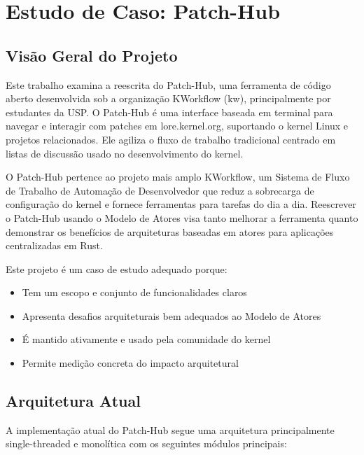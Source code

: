 \chapter{Estudo de Caso: Patch-Hub}

\section{Visão Geral do Projeto}

Este trabalho examina a reescrita do Patch-Hub, uma ferramenta de código aberto desenvolvida sob a organização KWorkflow (kw), principalmente por estudantes da USP. O Patch-Hub é uma interface baseada em terminal para navegar e interagir com patches em lore.kernel.org, suportando o kernel Linux e projetos relacionados. Ele agiliza o fluxo de trabalho tradicional centrado em listas de discussão usado no desenvolvimento do kernel.

O Patch-Hub pertence ao projeto mais amplo KWorkflow, um Sistema de Fluxo de Trabalho de Automação de Desenvolvedor que reduz a sobrecarga de configuração do kernel e fornece ferramentas para tarefas do dia a dia. Reescrever o Patch-Hub usando o Modelo de Atores visa tanto melhorar a ferramenta quanto demonstrar os benefícios de arquiteturas baseadas em atores para aplicações centralizadas em Rust.

Este projeto é um caso de estudo adequado porque:

\begin{itemize}
    \item Tem um escopo e conjunto de funcionalidades claros
    \item Apresenta desafios arquiteturais bem adequados ao Modelo de Atores
    \item É mantido ativamente e usado pela comunidade do kernel
    \item Permite medição concreta do impacto arquitetural
\end{itemize}

\section{Arquitetura Atual}

A implementação atual do Patch-Hub segue uma arquitetura principalmente single-threaded e monolítica com os seguintes módulos principais:

